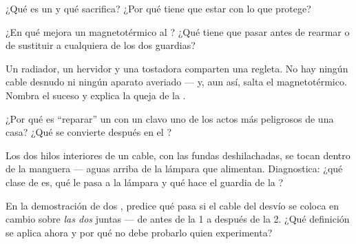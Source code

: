 \begin{exercise}[$\star$]\label{exo:g7:short-circuits-safety:5}
¿Qué es un  y qué sacrifica? ¿Por qué tiene que estar
 con lo que protege?
\end{exercise}

\begin{exercise}[$\star$]\label{exo:g7:short-circuits-safety:6}
¿En qué mejora un magnetotérmico al ? ¿Qué tiene que pasar
antes de rearmar o de sustituir a cualquiera de los dos guardias?
\end{exercise}

\begin{exercise}[$\star$]\label{exo:g7:short-circuits-safety:7}
Un radiador, un hervidor y una tostadora comparten una regleta. No hay
ningún cable desnudo ni ningún aparato averiado --- y, aun así, salta
el magnetotérmico. Nombra el suceso y explica la queja de la
.
\end{exercise}

\begin{exercise}[$\star$]\label{exo:g7:short-circuits-safety:8}
¿Por qué es ``reparar'' un  con un clavo uno de los actos más
peligrosos de una casa? ¿Qué se convierte después en el
?
\end{exercise}

\begin{exercise}[$\star\star$]\label{exo:g7:short-circuits-safety:9}
Los dos hilos interiores de un cable, con las fundas deshilachadas, se
tocan dentro de la manguera --- aguas arriba de la lámpara que
alimentan. Diagnostica: ¿qué clase de  es, qué le pasa
a la lámpara y qué hace el guardia de la ?
\end{exercise}

\begin{exercise}[$\star\star$]\label{exo:g7:short-circuits-safety:10}
En la demostración de dos , predice qué pasa si el cable
del desvío se coloca en cambio sobre \emph{las dos} 
juntas --- de antes de la  1 a después de la
 2. ¿Qué definición se aplica ahora y por qué no debe
probarlo quien experimenta?
\end{exercise}

